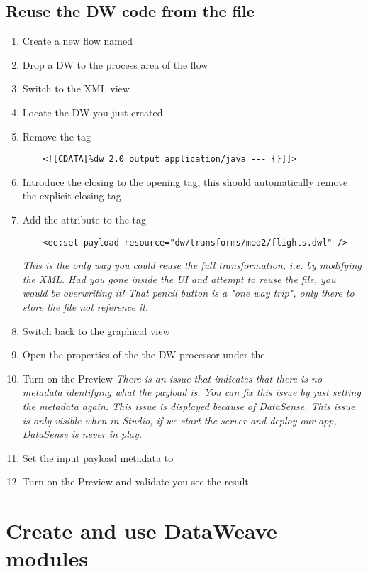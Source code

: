 \subsection{Reuse the DW code from the file}
\begin{enumerate}[resume*]
\item Create a new flow named 
\item Drop a DW to the process area of the flow
\item Switch to the XML view
\item Locate the DW you just created
\item Remove the  tag
  \begin{verbatim}
    <![CDATA[%dw 2.0 output application/java --- {}]]>
  \end{verbatim}
\item Introduce the \ttt{/} closing to the opening  tag, this should automatically remove the explicit closing tag
\item Add the attribute  to the  tag
  \begin{verbatim}
    <ee:set-payload resource="dw/transforms/mod2/flights.dwl" />
  \end{verbatim}
  \emph{
    This is the only way you could reuse the full transformation, i.e. by modifying the XML.  Had you gone inside
    the UI and attempt to reuse the file, you would be overwriting it!  That pencil button is a "one way trip",
    only there to store the file not reference it.
  }
\item Switch back to the graphical view
\item Open the properties of the the DW processor under the 
\item Turn on the Preview
  \emph{
    There is an issue that indicates that there is no metadata identifying what the payload is.  You can fix
    this issue by just setting the metadata again.  This issue is displayed because of DataSense.  This issue
    is only visible when in Studio, if we start the server and deploy our app, DataSense is never in play. 
  }
\item Set the input payload metadata to 
\item Turn on the Preview and validate you see the result
\end{enumerate}



\section{Create and use DataWeave modules}


